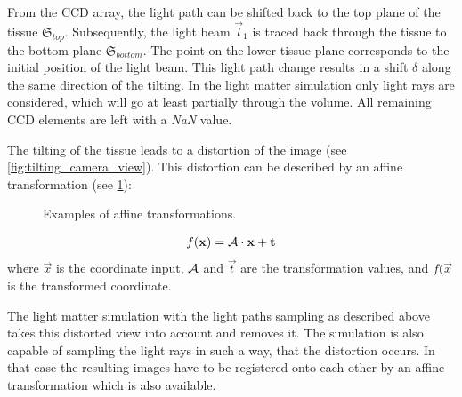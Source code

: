 From the \ac{CCD} array, the light path can be shifted back to the top plane of the tissue $\mathfrak{S}_{top}$.
Subsequently, the light beam $\vec{l}_1$ is traced back through the tissue to the bottom plane $\mathfrak{S}_{bottom}$.
The point on the lower tissue plane corresponds to the initial position of the light beam.
This light path change results in a shift $\delta$ along the same direction of the tilting.
In the light matter simulation only light rays are considered, which will go at least partially through the volume.
All remaining \ac{CCD} elements are left with a \textit{NaN} value.
\par
%
The tilting of the tissue leads to a distortion of the image (see \cref{fig:tilting_camera_view}).
This distortion can be described by an affine transformation (see \cref{fig::affine_transformation}):
%
\begin{figure}[!t]
\centering

\caption{Examples of affine transformations.}
\label{fig::affine_transformation}
\end{figure}
%
\begin{align}
f(\mathbf{x}) = \mathcal{A} \cdot \mathbf{x} + \mathbf{t}
\end{align}
where $\vec{x}$ is the coordinate input, $\mathcal{A}$ and $\vec{t}$ are the transformation values, and $f(\vec{x}$ is the transformed coordinate.
\par
%
The light matter simulation with the light paths sampling as described above takes this distorted view into account and removes it.
The simulation is also capable of sampling the light rays in such a way, that the distortion occurs.
In that case the resulting images have to be registered onto each other \eg{} by an affine transformation which is also available.
% 
% 
% 
